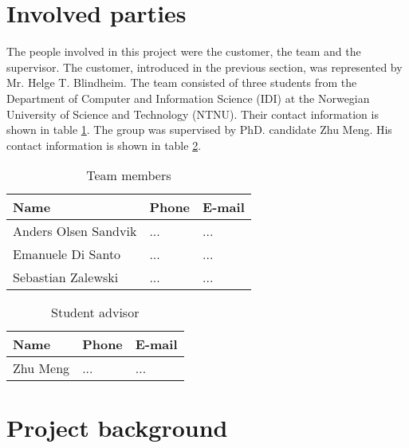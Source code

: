 \section{Involved parties}

The people involved in this project were the customer, the team and the supervisor.
The customer, introduced in the previous section, was represented by Mr. Helge T. Blindheim.
The team consisted of three students from the Department of Computer and Information Science (IDI) at the Norwegian University of Science and Technology (NTNU). Their contact information is shown in table \ref{table:team}. The group was supervised by PhD. candidate Zhu Meng. His contact information is shown in table \ref{table:advisor}.


\begin{table}
\begin{center}
\begin{tabular}{ l | l | l }
  \hline
  Name & Phone & E-mail \\
  \hline\noalign{\smallskip}\noalign{\smallskip}\hline
  Anders Olsen Sandvik	& ... & ... \\
  Emanuele Di Santo		& ... & ... \\
  Sebastian Zalewski	& ... & ... \\
  \hline
\end{tabular}
\end{center}
\caption{Team members}
\label{table:team}
\end{table}

\begin{table}
\begin{center}
\begin{tabular}{ l | l | l }
  \hline
  Name & Phone & E-mail \\
  \hline\noalign{\smallskip}\noalign{\smallskip}\hline
  Zhu Meng	& ... & ... \\
  \hline
\end{tabular}
\end{center}
\caption{Student advisor}
\label{table:advisor}
\end{table}


\newpage
\section{Project background}

